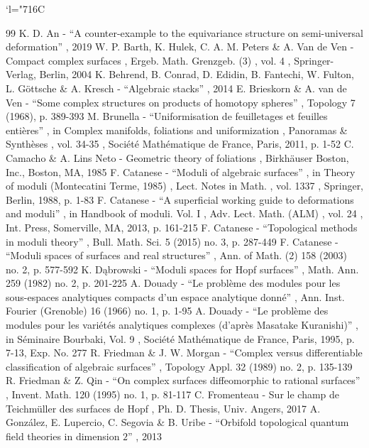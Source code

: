 \documentclass[10pt]{amsart}
\newcommand{\Changelback}{\mathcode`l="716C}
\theoremstyle{plain}
\theoremstyle{definition}
\theoremstyle{remark}
\numberwithin{equation}{section}
\begin{document}
\Changelback


\begin{thebibliography}{99}
 K. D. An - “A counter-example to the equivariance structure on semi-universal deformation” , 2019
 W. P. Barth, K. Hulek, C. A. M. Peters \& A. Van de Ven - Compact complex surfaces , Ergeb. Math. Grenzgeb. (3) , vol. 4 , Springer-Verlag, Berlin, 2004
 K. Behrend, B. Conrad, D. Edidin, B. Fantechi, W. Fulton, L. Göttsche \& A. Kresch - “Algebraic stacks” , 2014
 E. Brieskorn \& A. van de Ven - “Some complex structures on products of homotopy spheres” , Topology 7 (1968), p. 389-393
 M. Brunella - “Uniformisation de feuilletages et feuilles entières” , in Complex manifolds, foliations and uniformization , Panoramas \& Synthèses , vol. 34-35 , Société Mathématique de France, Paris, 2011, p. 1-52
 C. Camacho \& A. Lins Neto - Geometric theory of foliations , Birkhäuser Boston, Inc., Boston, MA, 1985
 F. Catanese - “Moduli of algebraic surfaces” , in Theory of moduli (Montecatini Terme, 1985) , Lect. Notes in Math. , vol. 1337 , Springer, Berlin, 1988, p. 1-83
 F. Catanese - “A superficial working guide to deformations and moduli” , in Handbook of moduli. Vol. I , Adv. Lect. Math. (ALM) , vol. 24 , Int. Press, Somerville, MA, 2013, p. 161-215
 F. Catanese - “Topological methods in moduli theory” , Bull. Math. Sci. 5 (2015) no. 3, p. 287-449
 F. Catanese - “Moduli spaces of surfaces and real structures” , Ann. of Math. (2) 158 (2003) no. 2, p. 577-592
 K. Dąbrowski - “Moduli spaces for Hopf surfaces” , Math. Ann. 259 (1982) no. 2, p. 201-225
 A. Douady - “Le problème des modules pour les sous-espaces analytiques compacts d’un espace analytique donné” , Ann. Inst. Fourier (Grenoble) 16 (1966) no. 1, p. 1-95
 A. Douady - “Le problème des modules pour les variétés analytiques complexes (d’après Masatake Kuranishi)” , in Séminaire Bourbaki, Vol. 9 , Société Mathématique de France, Paris, 1995, p. 7-13, Exp. No. 277
 R. Friedman \& J. W. Morgan - “Complex versus differentiable classification of algebraic surfaces” , Topology Appl. 32 (1989) no. 2, p. 135-139
 R. Friedman \& Z. Qin - “On complex surfaces diffeomorphic to rational surfaces” , Invent. Math. 120 (1995) no. 1, p. 81-117
 C. Fromenteau - Sur le champ de Teichmüller des surfaces de Hopf , Ph. D. Thesis, Univ. Angers, 2017
 A. González, E. Lupercio, C. Segovia \& B. Uribe - “Orbifold topological quantum field theories in dimension $2$” , 2013

\end{thebibliography}
\end{document}
